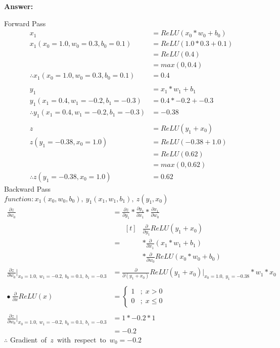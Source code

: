 \documentclass[12pt]{article}
\begin{document}
\newpage
\textbf{Answer:}
\par
Forward Pass
\begin{align*}
    x_1 &= ReLU(x_0 * w_0 + b_0) \\
    x_1(x_0=1.0, w_0 = 0.3, b_0 = 0.1) &= ReLU(1.0 * 0.3 + 0.1) \\
        &= ReLU(0.4) \\
        &= max(0,0.4) \\
    \therefore x_1(x_0=1.0, w_0 = 0.3, b_0 = 0.1) &= 0.4
    \\ \\
    y_1 &= x_1 * w_1 + b_1 \\
    y_1(x_1=0.4, w_1=-0.2, b_1=-0.3) &= 0.4 * -0.2 + -0.3 \\
    \therefore y_1(x_1=0.4, w_1=-0.2, b_1=-0.3) &= -0.38
    \\ \\
    z &= ReLU(y_1 + x_0) \\
    z(y_1=-0.38, x_0=1.0) &= ReLU(-0.38 + 1.0) \\
    &= ReLU(0.62) \\
    &= max(0,0.62) \\
    \therefore z(y_1=-0.38, x_0=1.0) &= 0.62
\end{align*}
\newpage
Backward Pass \\
$function: x_1(x_0,w_0,b_0),\ y_1(x_1,w_1,b_1),\ z(y_1,x_0)$
\begin{align*}
    \frac{\partial z}{\partial w_0} 
    & = \frac{\partial z}{\partial y_1} * \frac{\partial y_1}{\partial x_1} * \frac{\partial x_1}{\partial w_0} \\
    & = \begin{aligned}[t]
            & \frac{\partial}{\partial y_1} ReLU(y_1 + x_0) \\
            & * \frac{\partial}{\partial x_1} (x_1*w_1 + b_1) \\
            & * \frac{\partial}{\partial w_0} ReLU(x_0 * w_0 + b_0)
        \end{aligned} \\
    \frac{\partial z}{\partial w_0}\Big|_{x_0=1.0,\ w_1=-0.2,\ b_0=0.1,\ b_1=-0.3}
    & = \frac{\partial}{\partial (y_1+x_0)} ReLU(y_1 + x_0)\Big|_{x_0=1.0,\ y_1=-0.38} * w_1 * x_0
    \\ \\
    \bullet\ \frac{\partial}{\partial x} ReLU(x) &=
    \begin{cases}
    1 & ; \;x > 0 \\
    0 & ; \;x \leqslant 0
    \end{cases}
    \\ \\
    \frac{\partial z}{\partial w_0}\Big|_{x_0=1.0,\ w_1=-0.2,\ b_0=0.1,\ b_1=-0.3}
    & = 1 * -0.2 * 1 \\
    &= -0.2
\end{align*}
$\therefore$ Gradient\ of\ $z$\ with\ respect\ to\ $w_0 = -0.2$
\end{document}
